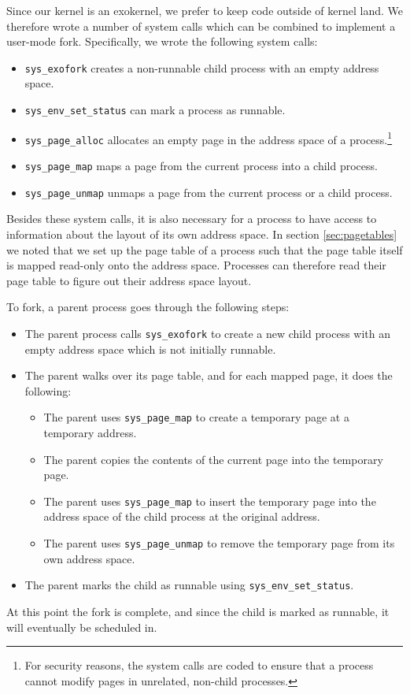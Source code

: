 \documentclass{report}
\begin{document}
Since our kernel is an exokernel, we prefer to keep code outside of kernel
land. We therefore wrote a number of system calls which can be combined to
implement a user-mode fork. Specifically, we wrote the following system calls:
\begin{itemize}
\item	\texttt{sys\_exofork} creates a non-runnable child process with an empty address space.
\item	\texttt{sys\_env\_set\_status} can mark a process as runnable.
\item	\texttt{sys\_page\_alloc} allocates an empty page in the address space
of a process.\footnote{For security reasons, the system calls are coded to
ensure that a process cannot modify pages in unrelated, non-child processes.}
\item	\texttt{sys\_page\_map} maps a page from the current process into a child process.
\item	\texttt{sys\_page\_unmap} unmaps a page from the current process or a child process.
\end{itemize}

Besides these system calls, it is also necessary for a process to have access
to information about the layout of its own address space.
In section \ref{sec:pagetables} we noted that we set up the page table of a
process such that the page table itself is mapped read-only onto the address
space. Processes can therefore read their page table to figure out their
address space layout.

To fork, a parent process goes through the following steps:
\begin{itemize}
\item The parent process calls \texttt{sys\_exofork} to create a new child
process with an empty address space which is not initially runnable.
\item The parent walks over its page table, and for each mapped page, it does
the following:
\begin{itemize}
\item The parent uses \texttt{sys\_page\_map} to create a temporary page at a
temporary address.
\item The parent copies the contents of the current page into the temporary
page.
\item The parent uses \texttt{sys\_page\_map} to insert the temporary page
into the address space of the child process at the original address.
\item The parent uses \texttt{sys\_page\_unmap} to remove the temporary page
from its own address space.
\end{itemize}
\item The parent marks the child as runnable using
\texttt{sys\_env\_set\_status}. 
\end{itemize}
At this point the fork is complete, and since the child is marked as runnable,
it will eventually be scheduled in.
\end{document}
